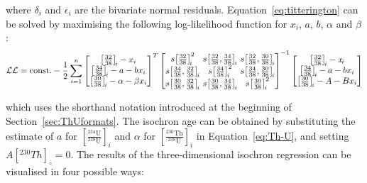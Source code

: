 \begin{refsection}
\noindent where $\delta_i$ and $\epsilon_i$ are the bivariate normal
residuals. Equation~\ref{eq:titterington} can be solved by maximising
the following log-likelihood function for $x_i$, $a$, $b$, $\alpha$
and $\beta$:
\begin{equation}
  \mathcal{LL} = \mbox{const.} - 
  \frac{1}{2} \sum\limits_{i=1}^{n}
  \left[
    \begin{array}{@{}c@{}}
      \left[\frac{32}{38}\right]_{\!i} - x_{i} \\
      \left[\frac{34}{38}\right]_{\!i} - a - b x_{i} \\
      \left[\frac{30}{38}\right]_{\!i} - \alpha - \beta x_{i}
    \end{array}
    \right]^T
  \left[
    \begin{array}{@{}c@{~}c@{~}c@{}}
      s\!\left[\frac{32}{38}\right]_{\!i}^2 &
      s\!\left[\frac{32}{38},\frac{34}{38}\right]_{\!i} &
      s\!\left[\frac{32}{38},\frac{30}{38}\right]_{\!i} \\
      s\!\left[\frac{34}{38},\frac{32}{38}\right]_{\!i} &
      s\!\left[\frac{34}{38}\right]_{\!i}^2 &
      s\!\left[\frac{34}{38},\frac{30}{38}\right]_{\!i} \\
      s\!\left[\frac{30}{38},\frac{32}{38}\right]_{\!i} &
      s\!\left[\frac{30}{38},\frac{34}{38}\right]_{\!i} &
      s\!\left[\frac{30}{38}\right]_{\!i}^2
    \end{array}
    \right]^{-1}
  \left[
    \begin{array}{@{}c@{}}
      \left[\frac{32}{38}\right]_{\!i} - x_{\!i} \\
      \left[\frac{34}{38}\right]_{\!i} - a - b x_{i} \\
      \left[\frac{30}{38}\right]_{\!i} - A - B x_{i}
    \end{array}
    \right]
\end{equation}

\noindent which uses the shorthand notation introduced at the
beginning of Section~\ref{sec:ThUformats}. The isochron age can be
obtained by substituting the estimate of $a$ for
$\left[\frac{{}^{234}\mbox{U}}{{}^{238}\mbox{U}}\right]_i$ and
$\alpha$ for
$\left[\frac{{}^{230}\mbox{Th}}{{}^{238}\mbox{U}}\right]_i$ in
Equation~\ref{eq:Th-U}, and setting $A[{}^{230}Th]_{\circ}=0$.  The
results of the three-dimensional isochron regression can be visualised
in four possible ways:


\end{refsection}
